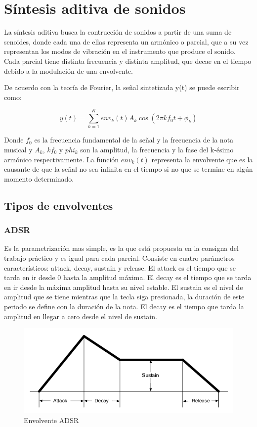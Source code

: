 \documentclass[assd_tp2_main.tex]{subfiles}
\begin{document}
\section{S\'intesis aditiva de sonidos}

La s\'intesis aditiva busca la contrucci\'on de sonidos a partir de una suma de senoides, donde cada una de ellas representa un arm\'onico o parcial, que a su vez representan los modos de vibraci\'on en el instrumento que produce el sonido. Cada parcial tiene distinta frecuencia y distinta amplitud, que decae en el tiempo debido a la modulaci\'on de una envolvente. 

De acuerdo con la teoría de Fourier, la señal sintetizada y(t) se puede escribir como:

\begin{equation}\label{eqn:additive}
 {y(t) = \sum_{k = 1}^{K}env_{k}(t)A_{k}\cos\left(2 \pi k f_{0}t+\phi_{k}\right)}
\end{equation}

Donde $f_{0}$ es la frecuencia fundamental de la señal y la frecuencia de la nota musical y $A_{k}$, $kf_{0}$ y $phi_{k}$ son la amplitud, la frecuencia y la fase del k-ésimo armónico respectivamente. La función $env_{k}(t)$ representa la envolvente que es la causante de que la señal no sea infinita en el tiempo si no que se termine en algún momento determinado.

\subsection{Tipos de envolventes}

\subsubsection{ADSR}
Es la parametrización mas simple, es la que está propuesta en la consigna del trabajo práctico y es igual para cada parcial.
Consiste en cuatro parámetros característicos: attack, decay, sustain y release.
El attack es el tiempo que se tarda en ir desde 0 hasta la amplitud máxima.
El decay es el tiempo que se tarda en ir desde la máxima amplitud hasta su nivel estable.
El sustain es el nivel de amplitud que se tiene mientras que la tecla siga presionada, la duración de este periodo se define con la duración de la nota.
El decay es el tiempo que tarda la amplitud en llegar a cero desde el nivel de sustain.

\begin{figure}[H]	
	\centering
	\includegraphics[scale=0.5]{graficos/adsr.png}
	\caption{Envolvente ADSR}
\end{figure}
\end{document}
